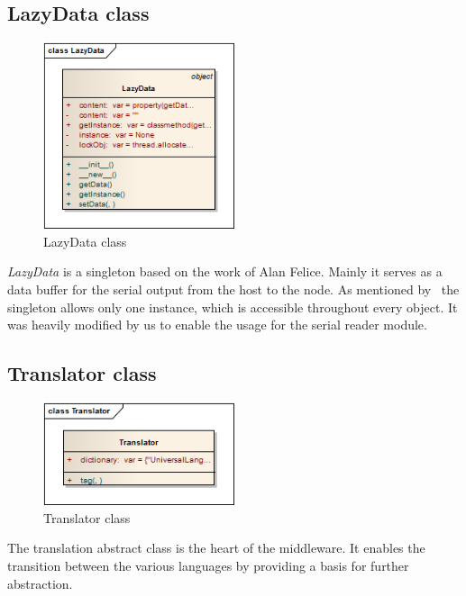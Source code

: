 \newpage
\subsection{LazyData class}
\begin{figure}[H]
   \centering
   \includegraphics[width=0.5\textwidth]{pic/LazyData.png}%
   \caption{LazyData class}
   \label{LazyDatapic}%
\end{figure}

\textit{LazyData} is a singleton based on the work of Alan Felice. Mainly it serves as a data buffer for the serial output from the host to the node. 
As mentioned by~\cite{GammaHelmJohnsonVlissides199711} the singleton allows only one instance, which is accessible throughout every object. It was
heavily modified by us to enable the usage for the serial reader module.

\newpage
\subsection{Translator class}
\begin{figure}[H]
   \centering
   \includegraphics[width=0.5\textwidth]{pic/Translator.png}%
   \caption{Translator class}
   \label{Translatorpic}%
\end{figure}

The translation abstract class is the heart of the middleware. It enables the transition between the various languages by providing a basis for further 
abstraction.

